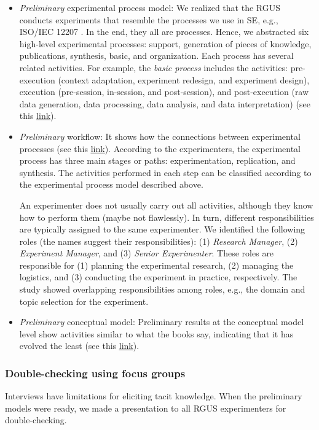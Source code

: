 \begin{itemize}
	\item \textit{Preliminary} experimental process model: We realized that the RGUS conducts experiments that resemble the processes we use in SE, e.g., ISO/IEC 12207 \cite{ISO-IEC-IEEE-12207}. In the end, they all are processes. Hence, we abstracted six high-level experimental processes: support, generation of pieces of knowledge, publications, synthesis, basic, and organization. Each process has several related activities. For example, the \textit{basic process} includes the activities: pre-execution (context adaptation, experiment redesign, and experiment design), execution (pre-session, in-session, and post-session), and post-execution (raw data generation, data processing, data analysis, and data interpretation) (see this \href{https://zenodo.org/record/7102301#.Yyt0GOzMLUI}{\ul{link}}).
	
\item \textit{Preliminary} workflow: It shows how the connections between experimental processes (see this \href{https://zenodo.org/record/7102360#.Yyt1a-zMLUI}{\ul{link}}). According to the experimenters, the experimental process has three main stages or paths: experimentation, replication, and synthesis. The activities performed in each step can be classified according to the experimental process model described above.

An experimenter does not usually carry out all activities, although they know how to perform them (maybe not flawlessly). In turn, different responsibilities are typically assigned to the same experimenter. We identified the following roles (the names suggest their responsibilities): (1) \textit{Research Manager}, (2) \textit{Experiment Manager}, and (3) \textit{Senior Experimenter}. These roles are responsible for (1) planning the experimental research, (2) managing the logistics, and (3) conducting the experiment in practice, respectively. The study showed overlapping responsibilities among roles, e.g., the domain and topic selection for the experiment.

	\item \textit{Preliminary} conceptual model: Preliminary results at the conceptual model level show activities similar to what the books say, indicating that it has evolved the least (see this \href{https://zenodo.org/record/7102387#.Yyt7W-zMLUI}{\ul{link}}).
\end{itemize}

\subsubsection{Double-checking using focus groups}\label{subsubsec-focus-groups}
Interviews have limitations for eliciting tacit knowledge. When the preliminary models were ready, we made a presentation to all RGUS experimenters for double-checking. 

